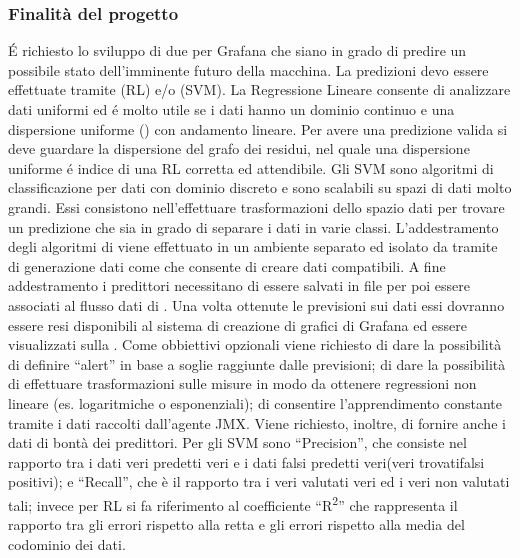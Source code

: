 		\subsubsection{Finalità del progetto}
			É richiesto lo sviluppo di due  per Grafana che siano in grado di predire un possibile stato dell'imminente futuro della macchina. La predizioni devo essere effettuate tramite  (RL) e/o  (SVM).
			La Regressione Lineare consente di analizzare dati uniformi ed é molto utile se i dati hanno un dominio continuo e una dispersione uniforme () con andamento lineare. Per avere una predizione valida si deve guardare la dispersione del grafo dei residui, nel quale una dispersione uniforme é indice di una RL corretta ed attendibile.
			Gli SVM sono algoritmi di classificazione per dati con dominio discreto e sono scalabili su spazi di dati molto grandi. Essi consistono nell'effettuare trasformazioni dello spazio dati per trovare un predizione che sia in grado di separare i dati in varie classi.
			L'addestramento degli algoritmi di  viene effettuato in un ambiente separato ed isolato da  tramite  di generazione dati come  che consente di creare dati compatibili. A fine addestramento i predittori necessitano di essere salvati in file  per poi essere associati al flusso dati di . Una volta ottenute le previsioni sui dati essi dovranno essere resi disponibili al sistema di creazione di grafici di Grafana ed essere visualizzati sulla .
			\newline
			Come obbiettivi opzionali viene richiesto di dare la possibilità di definire ``alert'' in base a soglie raggiunte dalle previsioni; di dare la possibilità di effettuare trasformazioni sulle misure in modo da ottenere regressioni non lineare (es. logaritmiche o esponenziali); di consentire l'apprendimento constante tramite i dati raccolti dall'agente JMX. Viene richiesto, inoltre, di fornire anche i dati di bontà dei predittori. Per gli SVM sono ``Precision'', che consiste nel rapporto tra i dati veri predetti veri e i dati falsi predetti veri(veri trovati\/falsi positivi); e ``Recall'', che è il rapporto tra i veri valutati veri ed i veri non valutati tali; invece per RL si fa riferimento al coefficiente ``R\textsuperscript{2}'' che rappresenta il rapporto tra gli errori rispetto alla retta e gli errori rispetto alla media del codominio dei dati.


